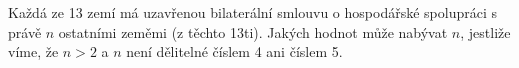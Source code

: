Každá ze 13 zemí má uzavřenou bilaterální smlouvu o hospodářské spolupráci s
právě $n$ ostatními zeměmi (z těchto 13ti). Jakých hodnot může nabývat $n$,
jestliže víme, že $n>2$ a $n$ není dělitelné číslem 4 ani číslem 5.
